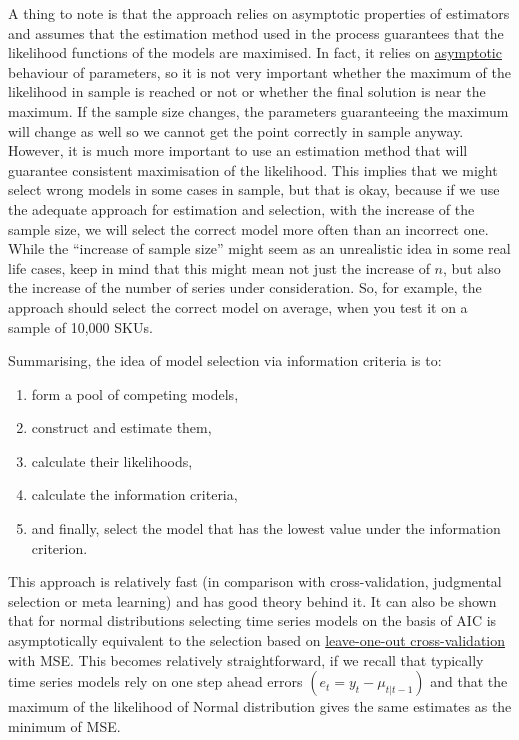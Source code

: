 \documentclass[
]{book}
\providecommand{\tightlist}{%
  \setlength{\itemsep}{0pt}\setlength{\parskip}{0pt}}
\theoremstyle{definition}
\theoremstyle{definition}
\theoremstyle{definition}
\theoremstyle{definition}
\theoremstyle{remark}
\begin{document}
A thing to note is that the approach relies on asymptotic properties of estimators and assumes that the estimation method used in the process guarantees that the likelihood functions of the models are maximised. In fact, it relies on \hyperref[likelihoodApproach]{asymptotic} behaviour of parameters, so it is not very important whether the maximum of the likelihood in sample is reached or not or whether the final solution is near the maximum. If the sample size changes, the parameters guaranteeing the maximum will change as well so we cannot get the point correctly in sample anyway. However, it is much more important to use an estimation method that will guarantee consistent maximisation of the likelihood. This implies that we might select wrong models in some cases in sample, but that is okay, because if we use the adequate approach for estimation and selection, with the increase of the sample size, we will select the correct model more often than an incorrect one. While the ``increase of sample size'' might seem as an unrealistic idea in some real life cases, keep in mind that this might mean not just the increase of \(n\), but also the increase of the number of series under consideration. So, for example, the approach should select the correct model on average, when you test it on a sample of 10,000 SKUs.

Summarising, the idea of model selection via information criteria is to:

\begin{enumerate}
\def\labelenumi{\arabic{enumi}.}
\tightlist
\item
  form a pool of competing models,
\item
  construct and estimate them,
\item
  calculate their likelihoods,
\item
  calculate the information criteria,
\item
  and finally, select the model that has the lowest value under the information criterion.
\end{enumerate}

This approach is relatively fast (in comparison with cross-validation, judgmental selection or meta learning) and has good theory behind it. It can also be shown that for normal distributions selecting time series models on the basis of AIC is asymptotically equivalent to the selection based on \href{https://en.wikipedia.org/wiki/Cross-validation_(statistics)\#Leave-one-out_cross-validation}{leave-one-out cross-validation} with MSE. This becomes relatively straightforward, if we recall that typically time series models rely on one step ahead errors \((e_t = y_t - \mu_{t|t-1})\) and that the maximum of the likelihood of Normal distribution gives the same estimates as the minimum of MSE.
\end{document}
